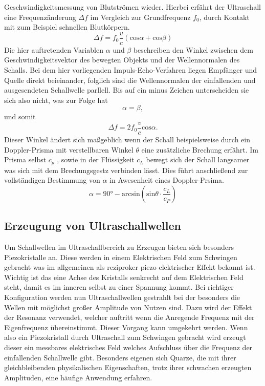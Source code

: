 Geschwindigkeitsmessung von Blutströmen wieder. Hierbei erfährt der Ultraschall eine Frequenzänderung $\Delta f$ im Vergleich zur Grundfrequenz $f_0$,
durch Kontakt mit zum Beispiel schnellen Blutkörpern. 
\begin{equation*}
  \Delta f = f_0 \frac{v}{c} \left ( \text{cos}\alpha + \text{cos}\beta \right )
\end{equation*}
Die hier auftretenden Variablen $\alpha$ und $\beta$ beschreiben den Winkel zwischen dem Geschwindigkeitsvektor des bewegten Objekts
und der Wellennormalen des Schalls. Bei dem hier vorliegenden Impuls-Echo-Verfahren liegen Empfänger und Quelle direkt beieinander, folglich sind 
die Wellennormalen der einfallenden und ausgesendeten Schallwelle parllell. Bis auf ein minus Zeichen unterscheiden sie sich also nicht, was zur Folge hat
\begin{equation*}
    \alpha = \beta,
\end{equation*}
und somit
\begin{equation}
    \label{eqn:deltaf}
    \Delta f = 2 f_0 \frac{v}{c} \text{cos}\alpha.
\end{equation}
Dieser Winkel ändert sich maßgeblich wenn der Schall beispielsweise durch ein Doppler-Prisma mit verstellbaren Winkel $\theta$ eine zusätzliche Brechung erfährt.
Im Prisma selbst $c_p$ \cite{....}, sowie in der Flüssigkeit $c_L$ \cite{....} bewegt sich der Schall  langsamer  was sich mit dem Brechungsgestz verbinden lässt. Dies 
führt anschließend zur vollständigen Bestimmung von $\alpha$ in Awesenheit eines Doppler-Prsima. 
\begin{equation}
    \label{eqn:alphafinal}
    \alpha = 90 \si{\degree} - \text{arcsin} \left( \text{sin}\theta \cdot \frac{c_L}{c_P} \right)
\end{equation}

\subsection{Erzeugung von Ultraschallwellen}
Um Schallwellen im Ultraschallbereich zu Erzeugen bieten sich besonders Piezokristalle an. Diese werden in einem Elektrischen Feld 
zum Schwingen gebracht was im allgemeinen als reziproker piezo-elektrischer Effekt bekannt ist. Wichtig ist das eine Achse des Kristalls
senkrecht auf dem Elektrischen Feld steht, damit es im inneren selbst zu einer Spannung kommt. Bei richtiger Konfiguration werden nun 
Ultraschallwellen gestrahlt bei der besonders die Wellen mit möglichst großer Amplitude von Nutzen sind. 
Dazu wird der Effekt der Resonanz verwendet, welcher auftritt wenn die Anregende Frequenz mit der Eigenfrequenz übereinstimmt.
Dieser Vorgang kann umgekehrt werden. Wenn also ein Piezokristall durch Ultraschall zum Schwingen gebracht wird erzeugt dieser ein messbares
elektrisches Feld welches Aufschluss über die Frequenz der einfallenden Schallwelle gibt. 
Besonders eigenen sich Quarze, die mit ihrer gleichbleibenden physikalischen Eigenschaften, trotz ihrer schwachen erzeugten Amplituden,
eine häufige Anwendung erfahren. 
